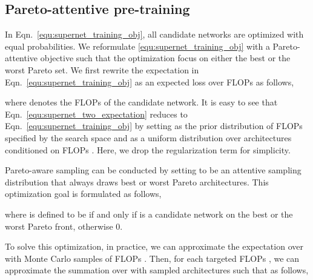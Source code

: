 \documentclass[final]{cvpr}
\theoremstyle{definition}
\begin{document}
\iffalse 
One the one hand, 
one might put more training budgets on models that are likely to form the Pareto frontier,
such that the Pareto set of models 
are trained with more data.
In practice, increasing training computation resource has been
proven to be an effective technique in improving DNN performance.
On the other hand, 
it is probably also important to improve the worst performing models. 
Intuitively, all neurons contribute to the final performance
in a collaborative way. 
It is important to ensure all neurons are well trained to reach
their maximum potential abilities. 
This idea is similar to \emph{hard example mining},
which has demonstrated remarkable success in object detection \cite{shrivastava2016training},  and many more. 
\red{better arguments..}
\fi



\subsection{Pareto-attentive pre-training}
\label{sec:pareto_aware_sampling}

In Eqn.~\eqref{equ:supernet_training_obj}, all candidate networks are optimized with equal probabilities.
We reformulate \eqref{equ:supernet_training_obj} with a Pareto-attentive objective
such that the optimization focus on either the best or the worst Pareto set. 
We first rewrite the expectation in Eqn.~\eqref{equ:supernet_training_obj} as 
an expected loss over FLOPs as follows, 

where  denotes the FLOPs of the candidate network.
It is easy to see that Eqn.~\eqref{equ:supernet_two_expectation} reduces to Eqn.~\eqref{equ:supernet_training_obj} by setting
 as the prior distribution of FLOPs specified by the search space  and   as a uniform distribution over architectures conditioned on FLOPs . 
Here, we drop the regularization term  for simplicity. 
 
Pareto-aware sampling can be conducted by setting 
 to be an attentive sampling distribution
that always draws {best} or {worst} Pareto architectures. 
This optimization goal is formulated as follows,

where  is defined to be  if and only if  is a candidate network on the best or the worst {Pareto} front, otherwise 0. 

To solve this optimization, 
in practice, we can approximate the expectation over 
with  Monte Carlo samples of FLOPs .  
Then,  for each targeted FLOPs , 
we can approximate the summation over 
with  sampled architectures  such that  as follows,
\end{document}

